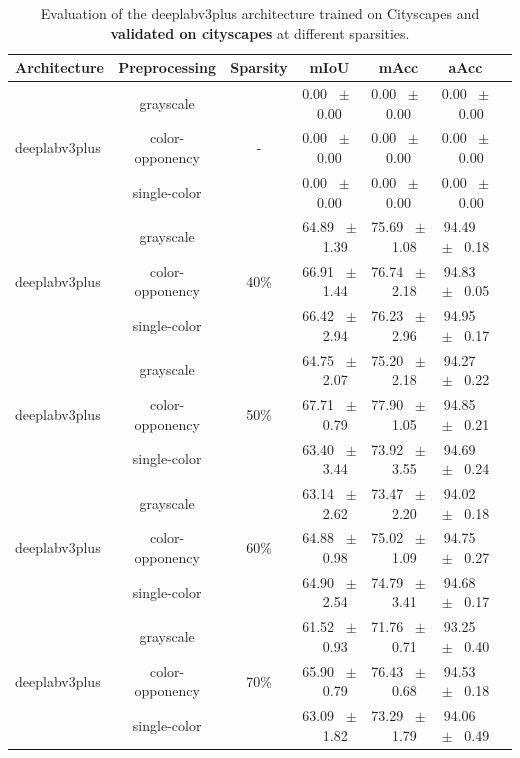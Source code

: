 \begin{table}[h]
  \centering
  \caption{Evaluation of the deeplabv3plus architecture trained on Cityscapes and \textbf{validated on cityscapes} at different sparsities.}
  \begin{tabular}{@{}lccc ccc@{}}
    \toprule
    Architecture & Preprocessing & Sparsity & mIoU & mAcc & aAcc \\
    \midrule
    \midrule
    \midrule
    \multirow{3}{*}{deeplabv3plus} & grayscale & \multirow{3}{*}{-} & 0.00 ~$\pm$~ 0.00 & 0.00 ~$\pm$~ 0.00 & 0.00 ~$\pm$~ 0.00 \\
    & color-opponency & & 0.00 ~$\pm$~ 0.00 & 0.00 ~$\pm$~ 0.00 & 0.00 ~$\pm$~ 0.00 \\
    & single-color & & 0.00 ~$\pm$~ 0.00 & 0.00 ~$\pm$~ 0.00 & 0.00 ~$\pm$~ 0.00 \\
    \midrule
    \multirow{3}{*}{deeplabv3plus} & grayscale & \multirow{3}{*}{40\%} & 64.89 ~$\pm$~ 1.39 & 75.69 ~$\pm$~ 1.08 & 94.49 ~$\pm$~ 0.18 \\
    & color-opponency & & 66.91 ~$\pm$~ 1.44 & 76.74 ~$\pm$~ 2.18 & 94.83 ~$\pm$~ 0.05 \\
    & single-color & & 66.42 ~$\pm$~ 2.94 & 76.23 ~$\pm$~ 2.96 & 94.95 ~$\pm$~ 0.17 \\
    \midrule
    \multirow{3}{*}{deeplabv3plus} & grayscale & \multirow{3}{*}{50\%} & 64.75 ~$\pm$~ 2.07 & 75.20 ~$\pm$~ 2.18 & 94.27 ~$\pm$~ 0.22 \\
    & color-opponency & & 67.71 ~$\pm$~ 0.79 & 77.90 ~$\pm$~ 1.05 & 94.85 ~$\pm$~ 0.21 \\
    & single-color & & 63.40 ~$\pm$~ 3.44 & 73.92 ~$\pm$~ 3.55 & 94.69 ~$\pm$~ 0.24 \\
    \midrule
    \multirow{3}{*}{deeplabv3plus} & grayscale & \multirow{3}{*}{60\%} & 63.14 ~$\pm$~ 2.62 & 73.47 ~$\pm$~ 2.20 & 94.02 ~$\pm$~ 0.18 \\
    & color-opponency & & 64.88 ~$\pm$~ 0.98 & 75.02 ~$\pm$~ 1.09 & 94.75 ~$\pm$~ 0.27 \\
    & single-color & & 64.90 ~$\pm$~ 2.54 & 74.79 ~$\pm$~ 3.41 & 94.68 ~$\pm$~ 0.17 \\
    \midrule
    \multirow{3}{*}{deeplabv3plus} & grayscale & \multirow{3}{*}{70\%} & 61.52 ~$\pm$~ 0.93 & 71.76 ~$\pm$~ 0.71 & 93.25 ~$\pm$~ 0.40 \\
    & color-opponency & & 65.90 ~$\pm$~ 0.79 & 76.43 ~$\pm$~ 0.68 & 94.53 ~$\pm$~ 0.18 \\
    & single-color & & 63.09 ~$\pm$~ 1.82 & 73.29 ~$\pm$~ 1.79 & 94.06 ~$\pm$~ 0.49 \\

\end{tabular}
\end{table}
